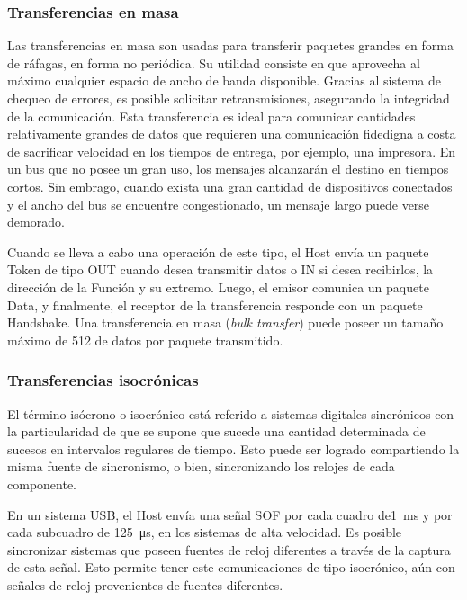 \subsubsection{Transferencias en masa}
	Las transferencias en masa son usadas para transferir paquetes grandes en forma de ráfagas, en forma no periódica. Su utilidad consiste en que aprovecha al máximo cualquier espacio de ancho de banda disponible. Gracias al sistema de chequeo de errores, es posible solicitar retransmisiones, asegurando la integridad de la comunicación. Esta transferencia es ideal para comunicar cantidades relativamente grandes de datos que requieren una comunicación fidedigna a costa de sacrificar velocidad en los tiempos de entrega, por ejemplo, una impresora. En un bus que no posee un gran uso, los mensajes alcanzarán el destino en tiempos cortos. Sin embrago, cuando exista una gran cantidad de dispositivos conectados y el ancho del bus se encuentre congestionado, un mensaje largo puede verse demorado.%

	Cuando se lleva a cabo una operación de este tipo, el Host envía un paquete Token de tipo OUT cuando desea transmitir datos o IN si desea recibirlos, la dirección de la Función y su extremo. Luego, el emisor comunica un paquete Data, y finalmente, el receptor de la transferencia responde con un paquete Handshake. Una transferencia en masa ({\it bulk transfer}) puede poseer un tamaño máximo de \SI{512}{\byte} de datos por paquete transmitido.
	
\subsubsection{Transferencias isocrónicas}
	El término isócrono o isocrónico está referido a sistemas digitales sincrónicos con la particularidad de que se supone que sucede una cantidad determinada de sucesos en intervalos regulares de tiempo. Esto puede ser logrado compartiendo la misma fuente de sincronismo, o bien, sincronizando los relojes de cada componente. 
	
	En un sistema USB, el Host envía una señal SOF por cada cuadro de\SI{1}{\milli\second} y por cada subcuadro de  \SI{125}{\micro\second}, en los sistemas de alta velocidad. Es posible sincronizar sistemas que poseen fuentes de reloj diferentes a través de la captura de esta señal. Esto permite tener este comunicaciones de tipo isocrónico, aún con señales de reloj provenientes de fuentes diferentes.%
	
